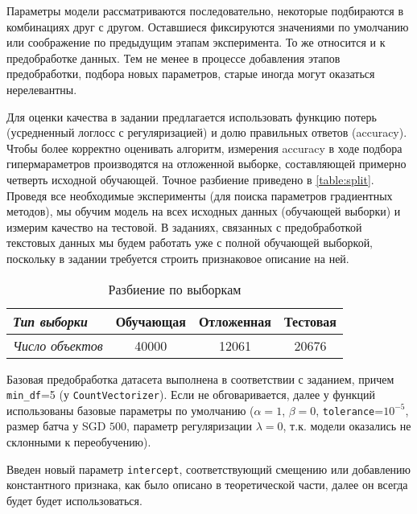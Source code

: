 \documentclass[12pt]{article}
\begin{document}
Параметры модели рассматриваются последовательно, некоторые подбираются в комбинациях друг с другом. Оставшиеся фиксируются значениями по умолчанию или соображение по предыдущим этапам эксперимента. То же относится и к предобработке данных. Тем не менее в процессе добавления этапов предобработки, подбора новых параметров, старые иногда могут оказаться нерелевантны. 

Для оценки качества в задании предлагается использовать функцию потерь (усредненный логлосс с регуляризацией) и долю правильных ответов (accuracy). Чтобы более корректно оценивать алгоритм, измерения accuracy в ходе подбора гипермараметров производятся на отложенной выборке, составляющей примерно четверть исходной обучающей. Точное разбиение приведено в \autoref{table:split}. Проведя все необходимые эксперименты (для поиска параметров градиентных методов), мы обучим модель на всех исходных данных (обучающей выборки) и измерим качество на тестовой. В заданиях, связанных с предобработкой текстовых данных мы будем работать уже с полной обучающей выборкой, поскольку в задании требуется строить признаковое описание на ней.

\begin{table}[h!]
    \centering
    \begin{tabular}{@{}lccc@{}}
    \toprule
    \textit{Тип выборки} & \textbf{Обучающая} & \textbf{Отложенная} & \textbf{Тестовая} \\ \midrule
    \textit{Число объектов} & 40000 & 12061 & 20676 \\ \bottomrule
    \end{tabular}
    \caption{Разбиение по выборкам}
    \label{table:split}
\end{table}


Базовая предобработка датасета выполнена в соответствии с заданием, причем \verb!min_df!=5 (у \verb!CountVectorizer!). Если не обговаривается, далее у функций использованы базовые параметры по умолчанию ($\alpha=1$, $\beta=0$, \verb!tolerance!=$10^{-5}$, размер батча у SGD $500$, параметр регуляризации $\lambda=0$, т.к. модели оказались не склонными к переобучению).

Введен новый параметр \verb!intercept!, соответствующий смещению или добавлению константного признака, как было описано в теоретической части, далее он всегда будет будет использоваться.
\end{document}
